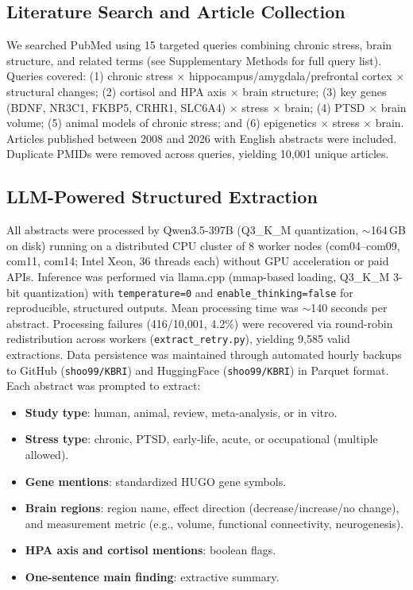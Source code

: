 \documentclass[12pt,a4paper]{article}
\begin{document}
\subsection{Literature Search and Article Collection}

We searched PubMed using 15 targeted queries combining chronic stress, brain structure, and related terms (see Supplementary Methods for full query list). Queries covered: (1) chronic stress $\times$ hippocampus/amygdala/prefrontal cortex $\times$ structural changes; (2) cortisol and HPA axis $\times$ brain structure; (3) key genes (BDNF, NR3C1, FKBP5, CRHR1, SLC6A4) $\times$ stress $\times$ brain; (4) PTSD $\times$ brain volume; (5) animal models of chronic stress; and (6) epigenetics $\times$ stress $\times$ brain. Articles published between 2008 and 2026 with English abstracts were included. Duplicate PMIDs were removed across queries, yielding 10,001 unique articles.

\subsection{LLM-Powered Structured Extraction}

All abstracts were processed by Qwen3.5-397B (Q3\_K\_M quantization, $\sim$164\,GB on disk) running on a distributed CPU cluster of 8 worker nodes (com04--com09, com11, com14; Intel Xeon, 36 threads each) without GPU acceleration or paid APIs. Inference was performed via llama.cpp (mmap-based loading, Q3\_K\_M 3-bit quantization) with \texttt{temperature=0} and \texttt{enable\_thinking=false} for reproducible, structured outputs. Mean processing time was $\sim$140 seconds per abstract. Processing failures (416/10,001, 4.2\%) were recovered via round-robin redistribution across workers (\texttt{extract\_retry.py}), yielding 9,585 valid extractions. Data persistence was maintained through automated hourly backups to GitHub (\texttt{shoo99/KBRI}) and HuggingFace (\texttt{shoo99/KBRI}) in Parquet format. Each abstract was prompted to extract:

\begin{itemize}
    \item \textbf{Study type}: human, animal, review, meta-analysis, or in vitro.
    \item \textbf{Stress type}: chronic, PTSD, early-life, acute, or occupational (multiple allowed).
    \item \textbf{Gene mentions}: standardized HUGO gene symbols.
    \item \textbf{Brain regions}: region name, effect direction (decrease/increase/no change), and measurement metric (e.g., volume, functional connectivity, neurogenesis).
    \item \textbf{HPA axis and cortisol mentions}: boolean flags.
    \item \textbf{One-sentence main finding}: extractive summary.
\end{itemize}
\end{document}
